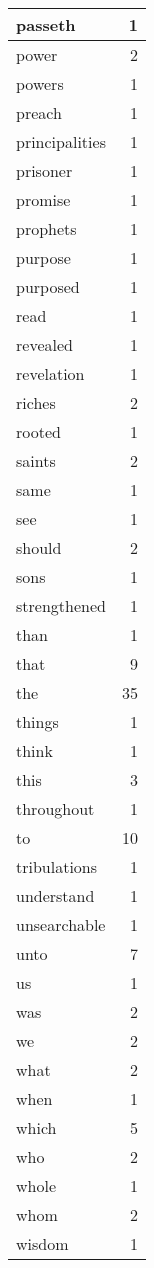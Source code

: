 \begin{center}
\begin{longtable}{l|r}
passeth & 1\\ \hline 
power & 2\\ \hline 
powers & 1\\ \hline 
preach & 1\\ \hline 
principalities & 1\\ \hline 
prisoner & 1\\ \hline 
promise & 1\\ \hline 
prophets & 1\\ \hline 
purpose & 1\\ \hline 
purposed & 1\\ \hline 
read & 1\\ \hline 
revealed & 1\\ \hline 
revelation & 1\\ \hline 
riches & 2\\ \hline 
rooted & 1\\ \hline 
saints & 2\\ \hline 
same & 1\\ \hline 
see & 1\\ \hline 
should & 2\\ \hline 
sons & 1\\ \hline 
strengthened & 1\\ \hline 
than & 1\\ \hline 
that & 9\\ \hline 
the & 35\\ \hline 
things & 1\\ \hline 
think & 1\\ \hline 
this & 3\\ \hline 
throughout & 1\\ \hline 
to & 10\\ \hline 
tribulations & 1\\ \hline 
understand & 1\\ \hline 
unsearchable & 1\\ \hline 
unto & 7\\ \hline 
us & 1\\ \hline 
was & 2\\ \hline 
we & 2\\ \hline 
what & 2\\ \hline 
when & 1\\ \hline 
which & 5\\ \hline 
who & 2\\ \hline 
whole & 1\\ \hline 
whom & 2\\ \hline 
wisdom & 1\\ \hline 

\end{longtable}
\end{center}
